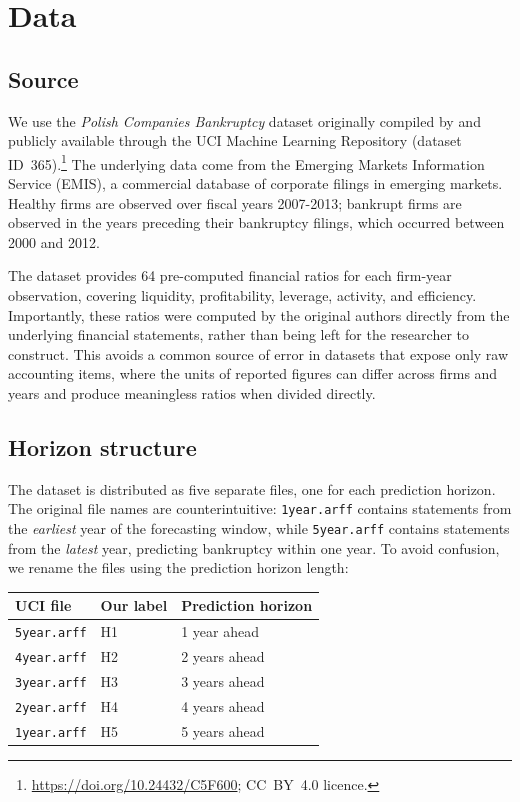 \documentclass[12pt,a4paper]{article}
\begin{document}
\clearpage
\section{Data}\label{sec:data}

\subsection{Source}

We use the \textit{Polish Companies Bankruptcy} dataset originally compiled by
\cite{zieba2016} and publicly available through the UCI Machine Learning
Repository (dataset ID~365).\footnote{\url{https://doi.org/10.24432/C5F600};
CC~BY~4.0 licence.} The underlying data come from the Emerging Markets
Information Service (EMIS), a commercial database of corporate filings in
emerging markets. Healthy firms are observed over fiscal years 2007-2013;
bankrupt firms are observed in the years preceding their bankruptcy filings,
which occurred between 2000 and 2012.

The dataset provides 64 pre-computed financial ratios for each firm-year
observation, covering liquidity, profitability, leverage, activity, and
efficiency. Importantly, these ratios were computed by the original authors
directly from the underlying financial statements, rather than being left for
the researcher to construct. This avoids a common source of error in datasets
that expose only raw accounting items, where the units of reported figures can
differ across firms and years and produce meaningless ratios when divided
directly.

\subsection{Horizon structure}
\label{sec:horizon-structure}

The dataset is distributed as five separate files, one for each prediction
horizon. The original file names are counterintuitive: \texttt{1year.arff} contains
statements from the \emph{earliest} year of the forecasting window, while
\texttt{5year.arff} contains statements from the \emph{latest} year,
predicting bankruptcy within one year. To avoid confusion, we rename
the files using the prediction horizon length:

\begin{center}
\begin{tabular}{lll}
\toprule
UCI file & Our label & Prediction horizon \\
\midrule
\texttt{5year.arff} & H1 & 1 year ahead  \\
\texttt{4year.arff} & H2 & 2 years ahead  \\
\texttt{3year.arff} & H3 & 3 years ahead  \\
\texttt{2year.arff} & H4 & 4 years ahead  \\
\texttt{1year.arff} & H5 & 5 years ahead  \\
\bottomrule
\end{tabular}
\end{center}
\end{document}
